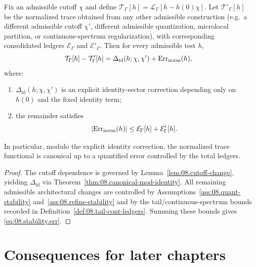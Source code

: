 \begin{theorem}\label{thm:08.normalization-stability}
Fix an admissible cutoff $\chi$ and define $\mathcal T_\Gamma[h]=\mathcal L_\Gamma[h-h(0)\chi]$.
Let $\mathcal T'_\Gamma[h]$ be the normalized trace obtained from any other admissible construction
(e.g.\ a different admissible cutoff $\chi'$, different admissible quantization, microlocal partition,
or continuous-spectrum regularization), with corresponding consolidated ledgers $\mathcal E_\Gamma$ and $\mathcal E'_\Gamma$.
Then for every admissible test $h$,
\begin{equation}\label{eq:08.stability.main}
\mathcal T_\Gamma[h]-\mathcal T'_\Gamma[h]
=
\Delta_{\mathrm{id}}(h;\chi,\chi')
+\mathrm{Err}_{\mathrm{norm}}(h),
\end{equation}
where:
\begin{enumerate}
\item $\Delta_{\mathrm{id}}(h;\chi,\chi')$ is an explicit identity-sector correction depending only on $h(0)$ and the fixed identity term;
\item the remainder satisfies
\begin{equation}\label{eq:08.stability.err}
|\mathrm{Err}_{\mathrm{norm}}(h)|
\le \mathcal E_\Gamma[h]+\mathcal E'_\Gamma[h].
\end{equation}
\end{enumerate}
In particular, modulo the explicit identity correction, the normalized trace functional is canonical up to a quantified error
controlled by the total ledgers.
\end{theorem}

\begin{proof}
The cutoff dependence is governed by Lemma~\ref{lem:08.cutoff-change}, yielding $\Delta_{\mathrm{id}}$ via
Theorem~\ref{thm:08.canonical-mod-identity}.
All remaining admissible architectural changes are controlled by Assumptions~\ref{ass:08.quant-stability} and~\ref{ass:08.refine-stability}
and by the tail/continuous-spectrum bounds recorded in Definition~\ref{def:08.tail-cont-ledgers}.
Summing these bounds gives \eqref{eq:08.stability.err}.
\end{proof}

\section{Consequences for later chapters}\label{sec:08.consequences}

